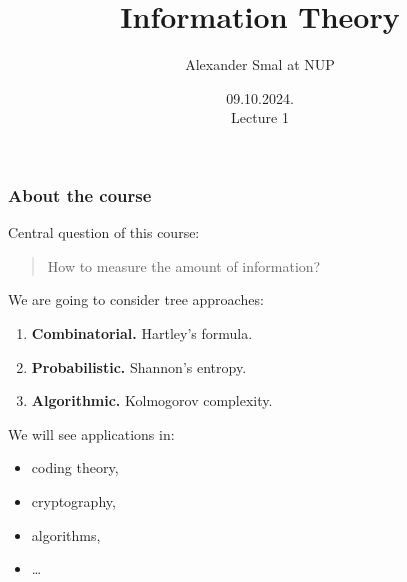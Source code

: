 \documentclass[handout,aspectratio=169]{beamer}
\title{Information Theory}
\author{Alexander Smal at NUP}
\date{09.10.2024.\\ Lecture 1}
\begin{document}
\begin{frame}[plain]
    \maketitle
\end{frame}

\begin{frame}
    \frametitle{About the course}
    Central question of this course:\medskip

    \begin{quote}
        How to measure the amount of information?
    \end{quote}

    \medskip\pause
    We are going to consider tree approaches:
    \begin{enumerate}
        \item \textbf{Combinatorial.} Hartley's formula.
        \item \textbf{Probabilistic.} Shannon's entropy.
        \item \textbf{Algorithmic.} Kolmogorov complexity.
    \end{enumerate}
    \medskip\pause
    We will see applications in:
    \begin{itemize}
        \item coding theory,
        \item cryptography,
        \item algorithms,
        \item \ldots
    \end{itemize}
\end{frame}

\end{document}
